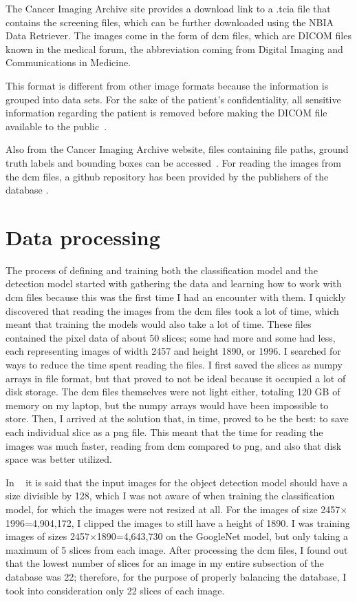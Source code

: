 The Cancer Imaging Archive site provides a download link to a .tcia file that contains the screening files, which can be further downloaded using the NBIA Data Retriever. The images come in the form of dcm files, which are DICOM files known in the medical forum, the abbreviation coming from Digital Imaging and Communications in Medicine.

This format is different from other image formats because the information is grouped into data sets. For the sake of the patient's confidentiality, all sensitive information regarding the patient is removed before making the DICOM file available to the public~\cite{carte6}.

Also from the Cancer Imaging Archive website, files containing file paths, ground truth labels and bounding boxes can be accessed~\cite{carte7}. For reading the images from the dcm files, a github repository has been provided by the publishers of the data\-base \cite{link5}.

\section{Data processing}

The process of defining and training both the classification model and the detection model started with gathering the data and learning how to work with dcm files because this was the first time I had an encounter with them. I quickly discovered that reading the images from the dcm files took a lot of time, which meant that training the models would also take a lot of time. These files contained the pixel data of about 50 slices; some had more and some had less, each representing images of width 2457 and height 1890, or 1996. I searched for ways to reduce the time spent reading the files. I first saved the slices as numpy arrays in file format, but that proved to not be ideal because it occupied a lot of disk storage. The dcm files themselves were not light either, totaling 120 GB of memory on my laptop, but the numpy arrays would have been impossible to store. Then, I arrived at the solution that, in time, proved to be the best: to save each individual slice as a png file. This meant that the time for reading the images was much faster, reading from dcm compared to png, and also that disk space was better utilized.

In ~\cite{carte8} it is said that the input images for the object detection model should have a size divisible by 128, which I was not aware of when training the classification model, for which the images were not resized at all. For the images of size 2457$\times$1996=4,904,172, I clipped the images to still have a height of 1890. I was training images of sizes 2457$\times$1890=4,643,730 on the GoogleNet model, but only taking a maximum of 5 slices from each image. After processing the dcm files, I found out that the lowest number of slices for an image in my entire subsection of the database was 22; therefore, for the purpose of properly balancing the database, I took into consideration only 22 slices of each image. 
 
